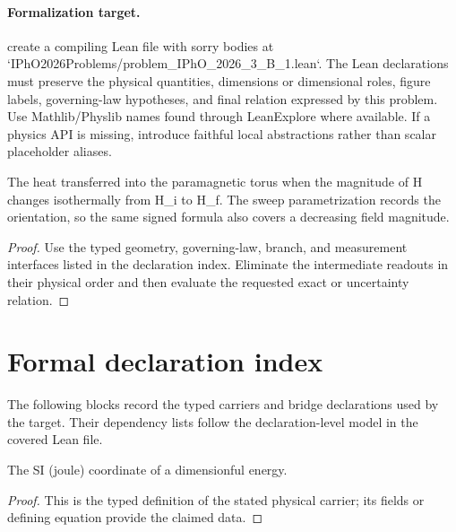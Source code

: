 \paragraph{Formalization target.}
create a compiling Lean file with sorry bodies at `IPhO2026Problems/problem\_IPhO\_2026\_3\_B\_1.lean`. The Lean declarations must preserve the physical quantities, dimensions or dimensional roles, figure labels, governing-law hypotheses, and final relation expressed by this problem.
Use Mathlib/Physlib names found through LeanExplore where available. If a physics API is missing, introduce faithful local abstractions rather than scalar placeholder aliases.

\begin{theorem}
  \label{thm:physics:IPhO_2026_3_B_1:target}
  The heat transferred into the paramagnetic torus when the magnitude of H changes isothermally from H\_i to H\_f. The sweep parametrization records the orientation, so the same signed formula also covers a decreasing field magnitude.
\end{theorem}
\begin{proof}
  Use the typed geometry, governing-law, branch, and measurement interfaces listed in the declaration index.  Eliminate the intermediate readouts in their physical order and then evaluate the requested exact or uncertainty relation.
\end{proof}
\section*{Formal declaration index}
The following blocks record the typed carriers and bridge declarations used by the target.  Their dependency lists follow the declaration-level model in the covered Lean file.

\begin{definition}
  \label{def:physics:IPhO_2026_3_B_1:aux001}
  The SI (joule) coordinate of a dimensionful energy.
\end{definition}
\begin{proof}
  This is the typed definition of the stated physical carrier; its fields or defining equation provide the claimed data.
\end{proof}


